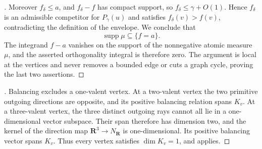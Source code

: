 \begin{proof}[]
Moreover $f_\delta\leq a$, and $f_\delta-f$ has compact support, so
$f_\delta\leq\gamma+O(1)$.  Hence $f_\delta$ is an admissible competitor
for $P_\gamma(u)$ and satisfies $f_\delta(v)>f(v)$, contradicting the
definition of the envelope.  We conclude that
\[
 \operatorname{supp}\mu\subseteq\{f=a\}.
\]
The integrand $f-a$ vanishes on the support of the nonnegative atomic
measure $\mu$, and the asserted orthogonality integral is therefore zero.
The argument is local at the vertices and never removes a bounded edge or
cuts a graph cycle, proving the last two assertions.
\end{proof}

\begin{proof}[]
Balancing excludes a one-valent vertex.  At a two-valent vertex the two
primitive outgoing directions are opposite, and its positive balancing
relation spans $K_v$.  At a three-valent vertex, the three distinct outgoing
rays cannot all lie in a one-dimensional vector subspace.  Their span
therefore has dimension two, and the kernel of the direction map
$\mathbf R^3\to N_{\mathbf R}$ is one-dimensional.  Its positive balancing
vector spans $K_v$.  Thus every vertex satisfies $\dim K_v=1$, and
 applies.
\end{proof}
